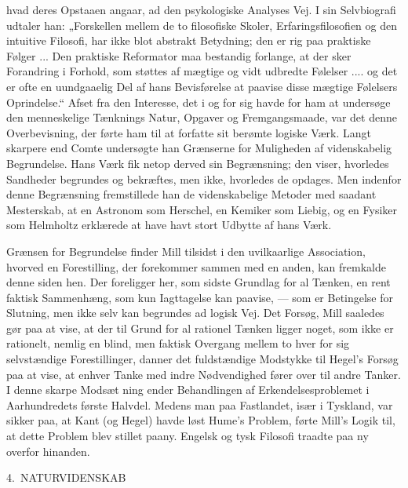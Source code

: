 \documentclass[12pt,a4paper,openany]{book}
\newcommand{\opage}[1]{\marginnote{\footnotesize\textit{[#1]}}}
\newcommand{\chapterhead}[2]{\par\bigskip\phantomsection\begin{center}{\large #1\ #2}\end{center}\addcontentsline{toc}{chapter}{#1 #2}\medskip}
\begin{document}
hvad deres Opstaaen angaar, ad den psykologiske Analyses Vej.
I sin Selvbiografi udtaler han: „Forskellen mellem de to filosofiske
Skoler, Erfaringsfilosofien og den intuitive Filosofi, har ikke blot abstrakt
Betydning; den er rig paa praktiske Følger ... Den praktiske
Reformator maa bestandig forlange, at der sker Forandring i Forhold,
som støttes af mægtige og vidt udbredte Følelser .... og det er
ofte en uundgaaelig Del af hans Bevisførelse at paavise disse mægtige
Følelsers Oprindelse.“ Afset fra den Interesse, det i og for sig
havde for ham at undersøge den menneskelige Tænknings Natur, Opgaver
og Fremgangsmaade, var det denne Overbevisning, der førte
ham til at forfatte sit berømte logiske Værk. Langt skarpere end Comte
undersøgte han Grænserne for Muligheden af videnskabelig Begrundelse.
Hans Værk fik netop derved sin Begrænsning; den viser, hvorledes
Sandheder begrundes og bekræftes, men ikke, hvorledes de opdages.
Men indenfor denne Begrænsning fremstillede han de videnskabelige
Metoder med saadant Mesterskab, at en Astronom som
Herschel, en Kemiker som Liebig, og en Fysiker som Helmholtz erklærede
at have havt stort Udbytte af hans Værk.

Grænsen for Begrundelse finder Mill tilsidst i den uvilkaarlige
Association, hvorved en Forestilling, der forekommer sammen med
en anden, kan fremkalde denne siden hen. Der foreligger her, som
sidste Grundlag for al Tænken, en rent faktisk Sammenhæng, som
kun Iagttagelse kan paavise, --- som er Betingelse for Slutning, men
ikke selv kan begrundes ad logisk Vej. Det Forsøg, Mill saaledes gør
paa at vise, at der til Grund for al rationel Tænken ligger noget, som
ikke er rationelt, nemlig en blind, men faktisk Overgang mellem to
hver for sig selvstændige Forestillinger, danner det fuldstændige
Modstykke til Hegel’s Forsøg paa at vise, at enhver Tanke med indre
Nødvendighed fører over til andre Tanker. I denne skarpe Modsæt%
\opage{22}ning ender Behandlingen af Erkendelsesproblemet i Aarhundredets
første Halvdel. Medens man paa Fastlandet, især i Tyskland, var
sikker paa, at Kant (og Hegel) havde løst Hume’s Problem, førte
Mill’s Logik til, at dette Problem blev stillet paany. Engelsk og tysk
Filosofi traadte paa ny overfor hinanden.

\chapterhead{4.}{NATURVIDENSKAB}
\end{document}
